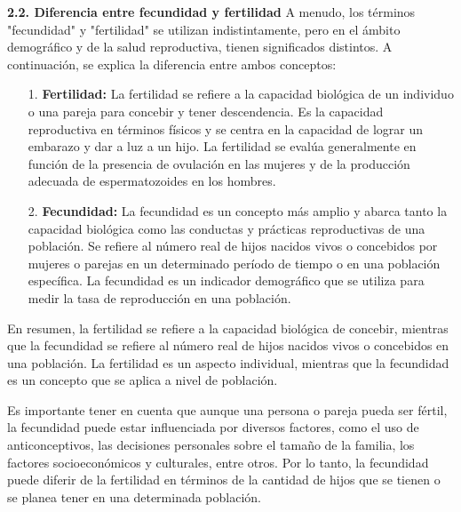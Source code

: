 \documentclass[8pt,a4paper]{beamer}
\begin{document}
{\begin{frame}{}
\begin{block}{}
\end{block}

\end{frame}


\begin{frame}{}
\begin{block}{\textbf{2.2. Diferencia entre fecundidad y fertilidad}}
\setlength{\parskip}{3px}
\justifying
A menudo, los términos "fecundidad" y "fertilidad" se utilizan indistintamente, pero en el ámbito demográfico y de la salud reproductiva, tienen significados distintos. A continuación, se explica la diferencia entre ambos conceptos:
\begin{enumerate}
\setlength{\parskip}{3px}
\justifying
\item[1.] \textbf{Fertilidad:} La fertilidad se refiere a la capacidad biológica de un individuo o una pareja para concebir y tener descendencia. Es la capacidad reproductiva en términos físicos y se centra en la capacidad de lograr un embarazo y dar a luz a un hijo. La fertilidad se evalúa generalmente en función de la presencia de ovulación en las mujeres y de la producción adecuada de espermatozoides en los hombres.

\item[2.] \textbf{Fecundidad:} La fecundidad es un concepto más amplio y abarca tanto la capacidad biológica como las conductas y prácticas reproductivas de una población. Se refiere al número real de hijos nacidos vivos o concebidos por mujeres o parejas en un determinado período de tiempo o en una población específica. La fecundidad es un indicador demográfico que se utiliza para medir la tasa de reproducción en una población.
\end{enumerate}
\end{block}
\end{frame}

\begin{frame}{}
\begin{block}{}
\setlength{\parskip}{3px}
\justifying
En resumen, la fertilidad se refiere a la capacidad biológica de concebir, mientras que la fecundidad se refiere al número real de hijos nacidos vivos o concebidos en una población. La fertilidad es un aspecto individual, mientras que la fecundidad es un concepto que se aplica a nivel de población.

Es importante tener en cuenta que aunque una persona o pareja pueda ser fértil, la fecundidad puede estar influenciada por diversos factores, como el uso de anticonceptivos, las decisiones personales sobre el tamaño de la familia, los factores socioeconómicos y culturales, entre otros. Por lo tanto, la fecundidad puede diferir de la fertilidad en términos de la cantidad de hijos que se tienen o se planea tener en una determinada población.
\end{block}
\end{frame}


}
\end{document}
